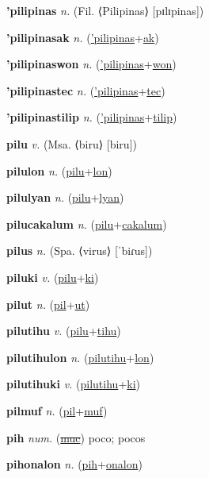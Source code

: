 \textbf{\hypertarget{'pilipinas}{'pilipinas}} \textit{n.} (Fil. ⟨Pilipinas⟩ [pɪlɪpinas])


\textbf{\hypertarget{'pilipinasak}{'pilipinasak}} \textit{n.} (\hyperlink{'pilipinas}{'pilipinas}+\allowbreak \hyperlink{ak}{ak})


\textbf{\hypertarget{'pilipinaswon}{'pilipinaswon}} \textit{n.} (\hyperlink{'pilipinas}{'pilipinas}+\allowbreak \hyperlink{won}{won})


\textbf{\hypertarget{'pilipinastec}{'pilipinastec}} \textit{n.} (\hyperlink{'pilipinas}{'pilipinas}+\allowbreak \hyperlink{tec}{tec})


\textbf{\hypertarget{'pilipinastilip}{'pilipinastilip}} \textit{n.} (\hyperlink{'pilipinas}{'pilipinas}+\allowbreak \hyperlink{tilip}{tilip})


\textbf{\hypertarget{pilu}{pilu}} \textit{v.} (Msa. ⟨biru⟩ [biru])


\textbf{\hypertarget{pilulon}{pilulon}} \textit{n.} (\hyperlink{pilu}{pilu}+\allowbreak \hyperlink{lon}{lon})


\textbf{\hypertarget{pilulyan}{pilulyan}} \textit{n.} (\hyperlink{pilu}{pilu}+\allowbreak \hyperlink{lyan}{lyan})


\textbf{\hypertarget{pilucakalum}{pilucakalum}} \textit{n.} (\hyperlink{pilu}{pilu}+\allowbreak \hyperlink{cakalum}{cakalum})


\textbf{\hypertarget{pilus}{pilus}} \textit{n.} (Spa. ⟨virus⟩ [ˈbiɾus])


\textbf{\hypertarget{piluki}{piluki}} \textit{v.} (\hyperlink{pilu}{pilu}+\allowbreak \hyperlink{ki}{ki})


\textbf{\hypertarget{pilut}{pilut}} \textit{n.} (\hyperlink{pil}{pil}+\allowbreak \hyperlink{ut}{ut})


\textbf{\hypertarget{pilutihu}{pilutihu}} \textit{v.} (\hyperlink{pilu}{pilu}+\allowbreak \hyperlink{tihu}{tihu})


\textbf{\hypertarget{pilutihulon}{pilutihulon}} \textit{n.} (\hyperlink{pilutihu}{pilutihu}+\allowbreak \hyperlink{lon}{lon})


\textbf{\hypertarget{pilutihuki}{pilutihuki}} \textit{v.} (\hyperlink{pilutihu}{pilutihu}+\allowbreak \hyperlink{ki}{ki})


\textbf{\hypertarget{pilmuf}{pilmuf}} \textit{n.} (\hyperlink{pil}{pil}+\allowbreak \hyperlink{muf}{muf})


\textbf{\hypertarget{pih}{pih}} \textit{num.} (\hyperlink{muc}{\sout{muc}})
poco; pocos

\textbf{\hypertarget{pihonalon}{pihonalon}} \textit{n.} (\hyperlink{pih}{pih}+\allowbreak \hyperlink{onalon}{onalon})


